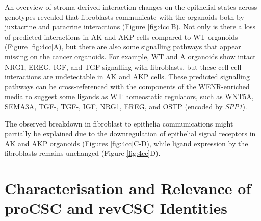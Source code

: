An overview of stroma-derived interaction changes on the epithelial states across genotypes revealed that fibroblasts communicate with the organoids both by juxtacrine and paracrine interactions (Figure \ref{fig:4cc}B). Not only is there a loss of predicted interactions in AK and AKP cells compared to WT organoids (Figure \ref{fig:4cc}A), but there are also some signalling pathways that appear missing on the cancer organoids. For example, WT and A organoids show intact NRG1, EREG, IGF, and TGF-\textbeta\hspace{0.1cm}signalling with fibroblasts, but these cell-cell interactions are undetectable in AK and AKP cells. These predicted signalling pathways can be cross-referenced with the components of the WENR-enriched media to suggest some ligands as WT homeostatic regulators, such as WNT5A, SEMA3A, TGF-, TGF-, IGF, NRG1, EREG, and OSTP (encoded by \emph{SPP1}).

The observed breakdown in fibroblast to epithelia communications might partially be explained due to the downregulation of epithelial signal receptors in AK and AKP organoids (Figures \ref{fig:4cc}C-D), while ligand expression by the fibroblasts remains unchanged (Figure \ref{fig:4cc}D).


\newpage
\section{Characterisation and Relevance of proCSC and revCSC Identities}

